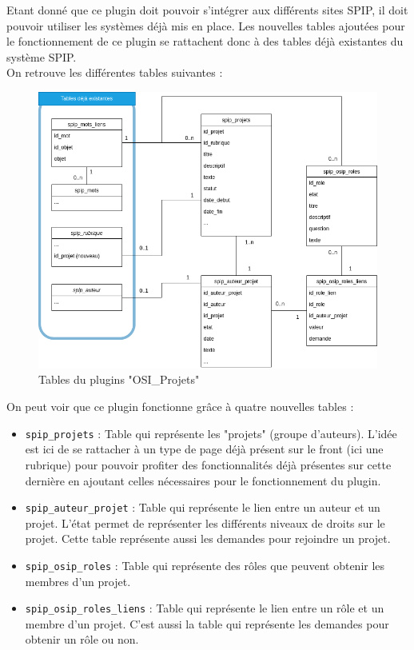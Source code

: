 Etant donné que ce plugin doit pouvoir s'intégrer aux différents sites SPIP, il doit pouvoir utiliser les systèmes déjà mis en place. Les nouvelles tables ajoutées pour le fonctionnement de ce plugin se rattachent donc à des tables déjà existantes du système SPIP.\\
\newline
On retrouve les différentes tables suivantes :

\vspace{0.5cm}

\begin{figure}[h]
    \centering
    \includegraphics[trim=0 0 0 0, clip, width=1\textwidth]{images/table_plugin_projet.drawio.png}
    \caption{Tables du plugins "OSI\_Projets"}
    \label{Tables du plugin osiprojets}
\end{figure}
\newpage
On peut voir que ce plugin fonctionne grâce à quatre nouvelles tables : 
\begin{itemize}
    \item \texttt{spip\_projets} : Table qui représente les "projets" (groupe d'auteurs). L'idée est ici de se rattacher à un type de page déjà présent sur le front (ici une rubrique) pour pouvoir profiter des fonctionnalités déjà présentes sur cette dernière en ajoutant celles nécessaires pour le fonctionnement du plugin.
    \item \texttt{spip\_auteur\_projet} : Table qui représente le lien entre un auteur et un projet. L'état permet de représenter les différents niveaux de droits sur le projet. Cette table représente aussi les demandes pour rejoindre un projet.
    \item \texttt{spip\_osip\_roles} : Table qui représente des rôles que peuvent obtenir les membres d'un projet.
    \item \texttt{spip\_osip\_roles\_liens} : Table qui représente le lien entre un rôle et un membre d'un projet. C'est aussi la table qui représente les demandes pour obtenir un rôle ou non. 
\end{itemize}
